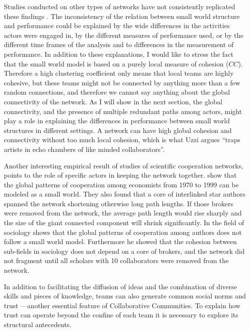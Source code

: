 Studies conducted on other types of networks have not consistently replicated these findings \citep*[for a recent review see][]{uzzi:2007}. The inconsistency of the relation between small world structure and performance could be explained by the wide differences in the activities actors were engaged in, by the different measures of performance used, or by the different time frames of the analysis and to differences in the measurement of performance. In addition to these explanations, I would like to stress the fact that the small world model is based on a purely local measure of cohesion ($CC$). Therefore a high clustering coefficient only means that local teams are highly cohesive, but these teams might not be connected by anything more than a few random connections, and therefore we cannot say anything about the global connectivity of the network. As I will show in the next section, the global connectivity, and the presence of multiple redundant paths among actors, might play a role in explaining the differences in performance between small world structures in different settings. A network can have high global cohesion and connectivity without too much local cohesion, which is what Uzzi argues ``traps artists in echo chambers of like minded collaborators''.

Another interesting empirical result of studies of scientific cooperation networks, points to the role of specific actors in keeping the network together. \citet*{goyal:2006} show that the global patterns of cooperation among economists from 1970 to 1999 can be modeled as a small world. They also found that a core of interlinked star authors spanned the network shortening otherwise long path lengths. If those brokers were removed from the network, the average path length would rise sharply and the size of the giant connected component will shrink significantly. In the field of sociology \citet{moody:2004} shows that the global patterns of cooperation among authors does not follow a small world model. Furthermore he showed that the cohesion between sub-fields in sociology does not depend on a core of brokers, and the network did not fragment until all scholars with 10 collaborators were removed from the network.

In addition to facilitating the diffusion of ideas and the combination of diverse skills and pieces of knowledge, teams can also generate common social norms and trust ---another essential feature of Collaborative Communities.  To explain how trust can operate beyond the confine of each team it is necessary to explore its structural antecedents.

